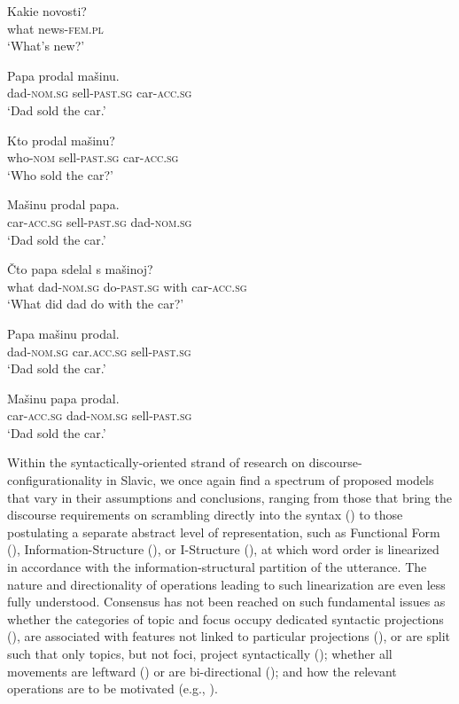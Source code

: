 \documentclass[output=paper]{langscibook}
\begin{document}
\ea%
    \label{ex:laleko:2}
\ea
\gll   Kakie   novosti?\\
what  news-\textsc{fem}.\textsc{pl}\\
\glt ‘What’s new?’

\ex
\gll Papa    prodal      mašinu.\\
    dad-\textsc{nom.sg}  sell-\textsc{past.sg}    car-\textsc{acc}.\textsc{sg}\\
\glt     ‘Dad sold the car.’
    \z
\z

\ea%
    \label{ex:laleko:3}
\ea
\gll   Kto     prodal      mašinu?      \\
who-\textsc{nom}  sell-\textsc{past.sg}    car-\textsc{acc}.\textsc{sg}\\
\glt ‘Who sold the car?’

\ex
\gll Mašinu  prodal      papa.\\
  car-\textsc{acc}.\textsc{sg}  sell-\textsc{past.sg}    dad-\textsc{nom.sg}\\
\glt   ‘Dad sold the car.’
\z
\z

\ea%
    \label{ex:laleko:4}
\ea
\gll    Čto   papa    sdelal    s  mašinoj?\\
    what  dad-\textsc{nom.sg}  do-\textsc{past.sg}  with  car-\textsc{acc.sg}  \\
\glt    ‘What did dad do with the car?’

\ex
\gll  Papa    mašinu    prodal.\\
    dad-\textsc{nom.sg}  car.\textsc{acc}.\textsc{sg}  sell-\textsc{past.sg}\\
\glt     ‘Dad sold the car.’

\ex
\gll Mašinu  papa    prodal.\\
  car-\textsc{acc.sg}  dad-\textsc{nom.sg}  sell-\textsc{past.sg}\\
\glt    ‘Dad sold the car.’
\z
\z

Within the syntactically-oriented strand of research on dis\-course-con\-fig\-u\-ra\-tion\-al\-i\-ty in Slavic, we once again find a spectrum of proposed models that vary in their assumptions and conclusions, ranging from those that bring the discourse requirements on scrambling directly into the syntax (\citealt{King1995}) to those postulating a separate abstract level of representation, such as Functional Form (\citealt{Bailyn1995}), Information-Structure (\citealt{JunghannsZybatow1997}), or I-Structure (\citealt{Kondrashova1996}), at which word order is linearized in accordance with the information-structural partition of the utterance. The nature and directionality of operations leading to such linearization are even less fully understood. Consensus has not been reached on such fundamental issues as whether the categories of topic and focus occupy dedicated syntactic projections (\citealt{King1995, Dyakonova2009}), are associated with features not linked to particular projections (\citealt{Kondrashova1996}), or are split such that only topics, but not foci, project syntactically (\citealt{JunghannsZybatow1997}); whether all movements are leftward (\citealt{Slioussar2007}) or are bi-directional (\citealt{Sekerina1997}); and how the relevant operations are to be motivated (e.g., \citealt{Titov2020}).
\end{document}
